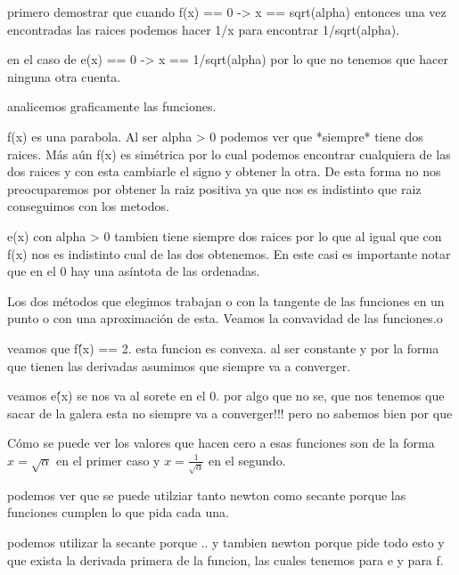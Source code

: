 \documentclass[10pt,a4paper]{article} \usepackage[utf8]{inputenc} %
\begin{document}

primero demostrar que cuando f(x) == 0 -> x == sqrt(alpha)
entonces una vez encontradas las raices podemos hacer 1/x para encontrar
1/sqrt(alpha).

en el caso de e(x) == 0 -> x == 1/sqrt(alpha) por lo que no tenemos que hacer
ninguna otra cuenta.

analicemos graficamente las funciones.


f(x) es una parabola. Al ser alpha > 0 podemos ver que *siempre* tiene dos
raices. Más aún f(x) es simétrica por lo cual podemos encontrar cualquiera de
las dos raices y con esta cambiarle el signo y obtener la otra. De esta forma
no nos preocuparemos por obtener la raiz positiva ya que nos es indistinto que
raiz conseguimos con los metodos.


e(x) con alpha > 0 tambien tiene siempre dos raices por lo que al igual que con
f(x) nos es indistinto cual de las dos obtenemos. En este casi es importante
notar que en el 0 hay una asíntota de las ordenadas.
 

Los dos métodos que elegimos trabajan o con la tangente de las funciones en un
punto o con una aproximación de esta. Veamos la convavidad de las funciones.o




veamos que f\'\'(x) == 2. esta funcion es convexa. al ser constante y por la
forma que tienen las derivadas asumimos que siempre va a converger.

veamos e\'\'(x) se nos va al sorete en el 0. por algo que no se, que nos tenemos
que sacar de la galera esta no siempre va a converger!!! pero no sabemos bien
por que


Cómo se puede ver los valores que hacen cero a esas funciones son de la forma
$x = \sqrt{\alpha}$ en el primer caso y $x = \frac{1}{\sqrt{\alpha}}$ en el
segundo.

podemos ver que se puede utilziar tanto newton como secante porque las
funciones cumplen lo que pida cada una.

podemos utilizar la secante porque .. y tambien newton porque pide todo esto y
que exista la derivada primera de la funcion, las cuales tenemos para e y para
f.
\end{document}
